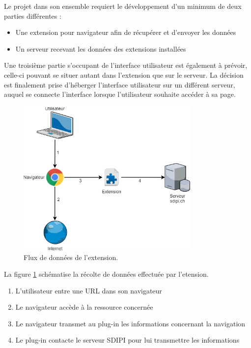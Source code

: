 		Le projet dans son ensemble requiert le développement d'un minimum de deux parties différentes :

		\begin{itemize}
			\item Une extension pour navigateur afin de récupérer et d'envoyer les données
			\item Un serveur recevant les données des extensions installées
		\end{itemize}

		Une troisième partie s'occupant de l'interface utilisateur est également à prévoir, celle-ci pouvant se situer autant dans l'extension que sur le serveur. La décision est finalement prise d'héberger l'interface utilisateur sur un différent serveur, auquel se connecte l'interface lorsque l'utilisateur souhaite accéder à sa page.

		\begin{figure}[h]
			\centering
			\includegraphics[width=0.8\textwidth]{images/design/intro/architecture}
			\caption{Flux de données de l'extension.}
			\label{d-architecture}
		\end{figure}

		La figure \ref{d-architecture} schématise la récolte de données effectuée par l'etension.
		\begin{enumerate}
			\item L'utilisateur entre une URL dans son navigateur
			\item Le navigateur accède à la ressource concernée
			\item Le navigateur transmet au plug-in les informations concernant la navigation
			\item Le plug-in contacte le serveur SDIPI pour lui transmettre les informations
		\end{enumerate}

